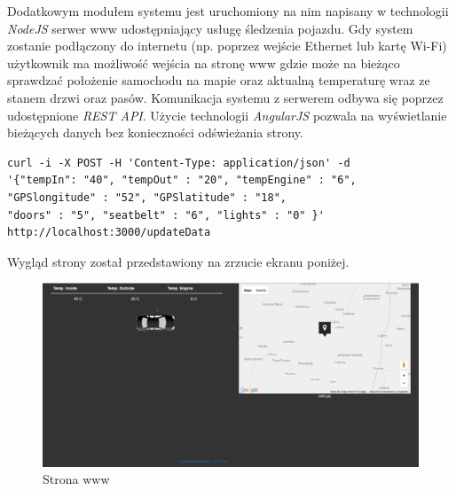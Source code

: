 \documentclass{xmgr}
\begin{document}
Dodatkowym modułem systemu jest uruchomiony na nim napisany w technologii \emph{NodeJS} serwer www udostępniający usługę śledzenia pojazdu. Gdy system zostanie podłączony do internetu (np. poprzez wejście Ethernet lub kartę Wi-Fi) użytkownik ma możliwość wejścia na stronę www gdzie może na bieżąco sprawdzać położenie samochodu na mapie oraz aktualną temperaturę wraz ze stanem drzwi oraz pasów. Komunikacja systemu z serwerem odbywa się poprzez udostępnione \emph{REST API}. Użycie technologii \emph{AngularJS} pozwala na wyświetlanie bieżących danych bez konieczności odświeżania strony.

\begin{lstlisting}[label=bot-dirs-alg,caption=Request wysyłany do serwera www]
curl -i -X POST -H 'Content-Type: application/json' -d 
'{"tempIn": "40", "tempOut" : "20", "tempEngine" : "6", 
"GPSlongitude" : "52", "GPSlatitude" : "18", 
"doors" : "5", "seatbelt" : "6", "lights" : "0" }' 
http://localhost:3000/updateData
\end{lstlisting}

Wygląd strony został przedstawiony na zrzucie ekranu poniżej.
\begin{figure}[!h]
    \centering
    	\includegraphics[height=0.35\textheight]{images/www.png}
    \caption{Strona www}
\end{figure}
\end{document}
